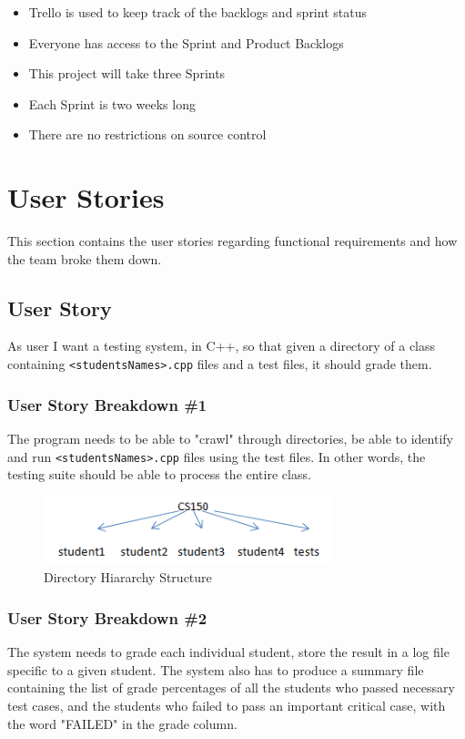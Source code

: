 \begin{itemize}
\item Trello is used to keep track of the backlogs and sprint status
\item Everyone has access to the Sprint and Product Backlogs
\item This project will take three Sprints
\item Each Sprint is two weeks long
\item There are no restrictions on source control 
\end{itemize}

\section{User Stories}
This section contains the user stories regarding functional requirements and how the team broke them down.

\subsection{User Story}
As user I want a testing system, in C++,  so that given a directory of a class containing {\tt <studentsNames>.cpp} files and a test files, it should grade them. 

\subsubsection{User Story Breakdown \#1}
The program needs to be able to "crawl" through directories, be able to identify and run {\tt <studentsNames>.cpp} files using the test files. In other words, the testing suite should be able to process the entire class. 

\begin{figure}[tbh]
\begin{center}
\includegraphics[width=0.75\textwidth]{./Capture}
\end{center}
\caption{Directory Hiararchy Structure \label{directoryhiararchystructure}}
\end{figure}

\subsubsection{User Story Breakdown \#2}
The system needs to grade each individual student, store the result in a log file specific to a given student. The system also has to produce a summary file containing the list of grade percentages of all the students who passed necessary test cases, and the students who failed to pass an important critical case, with the word "FAILED" in the grade column.

